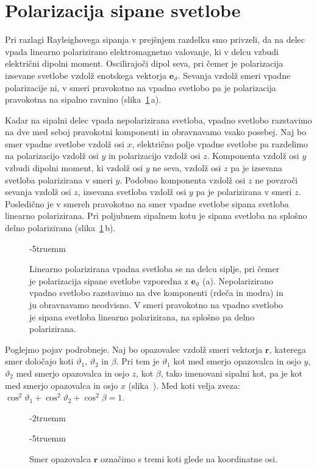 \section{Polarizacija sipane svetlobe}
Pri razlagi Rayleighovega sipanja v prejšnjem razdelku smo privzeli, da na
delec vpada linearno polarizirano elektromagnetno valovanje, ki v delcu vzbudi 
električni dipolni moment. Oscilirajoči dipol seva, pri čemer je polarizacija
izsevane svetlobe vzdolž enotskega vektorja $\mathbf{e}_\vartheta$. Sevanja vzdolž
smeri vpadne polarizacije ni, v smeri pravokotno na vpadno svetlobo pa je polarizacija
pravokotna na sipalno ravnino (slika~\ref{fig:07_pol}\,a).

Kadar na sipalni delec vpada nepolarizirana svetloba, vpadno svetlobo razstavimo
na dve med seboj pravokotni komponenti in obravnavamo vsako posebej. Naj bo smer
vpadne svetlobe vzdolž osi $x$, električno polje vpadne svetlobe pa razdelimo na 
polarizacijo vzdolž osi $y$ in polarizacijo vzdolž osi $z$.  
Komponenta vzdolž osi $y$ vzbudi dipolni moment, ki vzdolž osi $y$ 
ne seva, vzdolž osi $z$ pa je izsevana svetloba polarizirana v smeri $y$. 
Podobno komponenta vzdolž osi $z$ ne povzroči sevanja vzdolž osi $z$,
izsevana svetloba vzdolž osi $y$ pa je polarizirana v smeri $z$. Posledično je v smereh
pravokotno na smer vpadne svetlobe sipana svetloba linearno polarizirana. 
Pri poljubnem sipalnem kotu je sipana svetloba na splošno delno polarizirana 
(slika~\ref{fig:07_pol}\,b).
\begin{figure}[!h]
\centering
\def\svgwidth{130truemm} 

\caption{Linearno polarizirana vpadna svetloba se na delcu siplje, pri čemer je polarizacija
sipane svetlobe vzporedna z $\mathbf{e}_\vartheta$ (a). Nepolarizirano vpadno svetlobo
razstavimo na dve komponenti (rdeča in modra) in ju obravnavamo neodvisno. 
V smeri pravokotno na vpadno svetlobo je sipana svetloba linearno polarizirana, na splošno
pa delno polarizirana.}
\label{fig:07_pol}
\vglue-5truemm
\end{figure}

Poglejmo pojav podrobneje. Naj bo opazovalec vzdolž smeri vektorja $\mathbf{r}$, katerega
smer določajo koti $\vartheta_1$, $\vartheta_2$ in $\beta$. Pri tem je $\vartheta_1$ 
kot med smerjo opazovalca in osjo $y$, $\vartheta_2$ med smerjo opazovalca in 
osjo $z$, kot $\beta$, tako imenovani sipalni kot, pa je kot med smerjo opazovalca 
in osjo $x$ (slika~). Med koti velja 
zveza: $\cos^2 \vartheta_1 + \cos^2 \vartheta_2 + \cos^2 \beta = 1$.
\begin{figure}[!h]
\vglue-2truemm
\centering
\def\svgwidth{50truemm} 

\caption{Smer opazovalca $\mathbf{r}$ označimo s tremi koti glede na koordinatne osi.}
\label{fig:07_smernikoti}
\vglue-5truemm
\end{figure}

